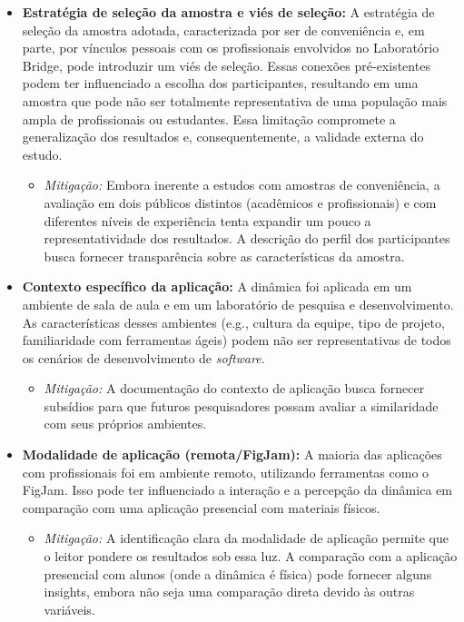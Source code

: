 \documentclass[
	12pt,
	openright,
	twoside,
	a4paper,
	english,
	brazil
	]{abntex2}
\begin{document}
\begin{itemize}
  \item \textbf{Estratégia de seleção da amostra e viés de seleção:} A estratégia de seleção da amostra adotada, caracterizada por ser de conveniência e, em parte, por vínculos pessoais com os profissionais envolvidos no Laboratório Bridge, pode introduzir um viés de seleção. Essas conexões pré-existentes podem ter influenciado a escolha dos participantes, resultando em uma amostra que pode não ser totalmente representativa de uma população mais ampla de profissionais ou estudantes. Essa limitação compromete a generalização dos resultados e, consequentemente, a validade externa do estudo.
    \begin{itemize}
    \item \textit{Mitigação:} Embora inerente a estudos com amostras de conveniência, a avaliação em dois públicos distintos (acadêmicos e profissionais) e com diferentes níveis de experiência tenta expandir um pouco a representatividade dos resultados. A descrição do perfil dos participantes busca fornecer transparência sobre as características da amostra.
    \end{itemize}
  \item \textbf{Contexto específico da aplicação:} A dinâmica foi aplicada em um ambiente de sala de aula e em um laboratório de pesquisa e desenvolvimento. As características desses ambientes (e.g., cultura da equipe, tipo de projeto, familiaridade com ferramentas ágeis) podem não ser representativas de todos os cenários de desenvolvimento de \textit{software}.
    \begin{itemize}
    \item \textit{Mitigação:} A documentação do contexto de aplicação busca fornecer subsídios para que futuros pesquisadores possam avaliar a similaridade com seus próprios ambientes.
    \end{itemize}
  \item \textbf{Modalidade de aplicação (remota/FigJam):} A maioria das aplicações com profissionais foi em ambiente remoto, utilizando ferramentas como o FigJam. Isso pode ter influenciado a interação e a percepção da dinâmica em comparação com uma aplicação presencial com materiais físicos.
    \begin{itemize}
    \item \textit{Mitigação:} A identificação clara da modalidade de aplicação permite que o leitor pondere os resultados sob essa luz. A comparação com a aplicação presencial com alunos (onde a dinâmica é física) pode fornecer alguns insights, embora não seja uma comparação direta devido às outras variáveis.
    \end{itemize}
\end{itemize}
\end{document}
